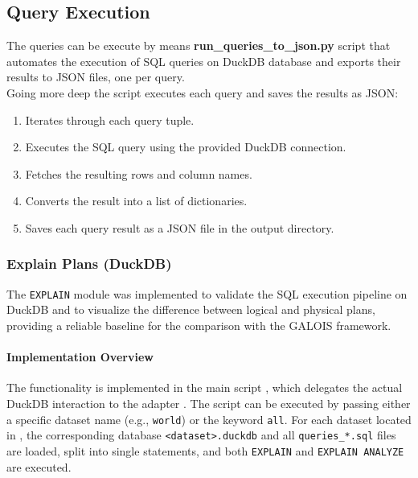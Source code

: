 \documentclass[12pt,a4paper]{article}
\begin{document}
\subsection{Query Execution}
The queries can be execute by means \textbf{run\_queries\_to\_json.py} script that automates the execution of SQL queries on DuckDB database and exports their results to JSON files, one per query.\\
Going more deep the script executes each query and saves the results as JSON:

\begin{enumerate}
    \item Iterates through each query tuple.
    \item Executes the SQL query using the provided DuckDB connection.
    \item Fetches the resulting rows and column names.
    \item Converts the result into a list of dictionaries.
    \item Saves each query result as a JSON file in the output directory.
\end{enumerate}

\subsubsection{Explain Plans (DuckDB)}
\label{sec:explain-plans}

The \texttt{EXPLAIN} module was implemented to validate the SQL execution
pipeline on DuckDB and to visualize the difference between logical and
physical plans, providing a reliable baseline for the comparison with the
GALOIS framework. 

\paragraph{Implementation Overview}
The functionality is implemented in the main script
, which delegates the
actual DuckDB interaction to the adapter
. The script can be executed by passing
either a specific dataset name (e.g., \texttt{world}) or the keyword
\texttt{all}. For each dataset located in
, the corresponding database
\texttt{<dataset>.duckdb} and all \texttt{queries\_*.sql} files are loaded,
split into single statements, and both \texttt{EXPLAIN} and
\texttt{EXPLAIN ANALYZE} are executed.
\end{document}
